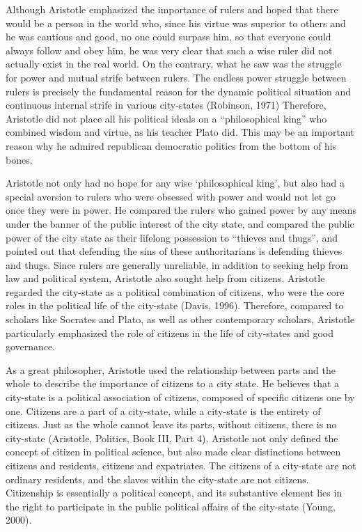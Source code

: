 \documentclass[11pt]{article}
\begin{document}
Although Aristotle emphasized the importance of rulers and hoped that there would be a person in the world who, since his virtue was superior to others and he was cautious and good, no one could surpass him, so that everyone could always follow and obey him, he was very clear that such a wise ruler did not actually exist in the real world. On the contrary, what he saw was the struggle for power and mutual strife between rulers. The endless power struggle between rulers is precisely the fundamental reason for the dynamic political situation and continuous internal strife in various city-states (Robinson, 1971) Therefore, Aristotle did not place all his political ideals on a “philosophical king” who combined wisdom and virtue, as his teacher Plato did. This may be an important reason why he admired republican democratic politics from the bottom of his bones.

Aristotle not only had no hope for any wise ‘philosophical king', but also had a special aversion to rulers who were obsessed with power and would not let go once they were in power. He compared the rulers who gained power by any means under the banner of the public interest of the city state, and compared the public power of the city state as their lifelong possession to “thieves and thugs”, and pointed out that defending the sins of these authoritarians is defending thieves and thugs. Since rulers are generally unreliable, in addition to seeking help from law and political system, Aristotle also sought help from citizens. Aristotle regarded the city-state as a political combination of citizens, who were the core roles in the political life of the city-state (Davis, 1996). Therefore, compared to scholars like Socrates and Plato, as well as other contemporary scholars, Aristotle particularly emphasized the role of citizens in the life of city-states and good governance.

As a great philosopher, Aristotle used the relationship between parts and the whole to describe the importance of citizens to a city state. He believes that a city-state is a political association of citizens, composed of specific citizens one by one. Citizens are a part of a city-state, while a city-state is the entirety of citizens. Just as the whole cannot leave its parts, without citizens, there is no city-state (Aristotle, Politics, Book III, Part 4). Aristotle not only defined the concept of citizen in political science, but also made clear distinctions between citizens and residents, citizens and expatriates. The citizens of a city-state are not ordinary residents, and the slaves within the city-state are not citizens. Citizenship is essentially a political concept, and its substantive element lies in the right to participate in the public political affairs of the city-state (Young, 2000).
\end{document}
